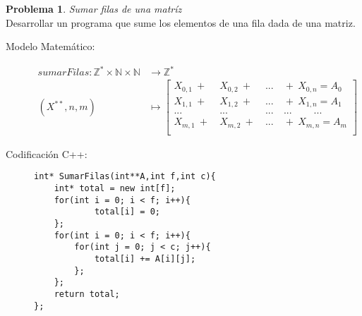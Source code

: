 \documentclass{article}
\theoremstyle{plain}
\theoremstyle{definition}
\newtheorem{problem}{Problema}
\begin{document}
\begin{problem} \emph{Sumar filas de una matríz}\\
Desarrollar un programa que sume los elementos de una fila dada de una matriz.
\begin{description}
\item[Modelo Matemático:]
\begin{align*}
sumarFilas: \mathbb{Z}^{*}\times\mathbb{N}\times\mathbb{N} &\to \mathbb{Z}^*\\
(X^{**},n,m) &\mapsto
\begin{bmatrix}
X_{0,1}\ + \ & X_{0,2}\ + \ & ... & \ + \ X_{0,n} = A_{0}\\
X_{1,1}\ + \ & X_{1,2}\ + \ & ... & \ + \ X_{1,n} = A_{1}\\
...\  \ & ...\   & ... &  \ ... \ \ \ \ \ \ \ \ \ \ ...\\
X_{m,1}\ + \ & X_{m,2}\ + \ & ... & \ + \ X_{m,n} = A_{m} \\
\end{bmatrix}
\end{align*}
%
\item[Codificación \textsf{C++}:]\hfill
%
\begin{verbatim}
int* SumarFilas(int**A,int f,int c){
    int* total = new int[f];
    for(int i = 0; i < f; i++){
            total[i] = 0;
    };
    for(int i = 0; i < f; i++){
        for(int j = 0; j < c; j++){
            total[i] += A[i][j];
        };
    };
    return total;
};
\end{verbatim}
\end{description}
\end{problem}
\end{document}
